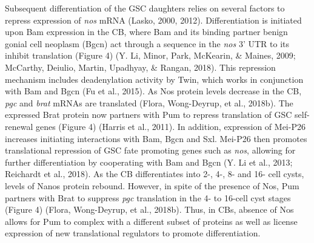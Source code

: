 \documentclass[12pt,oneside]{reedthesis}
\begin{document}
Subsequent differentiation of the GSC daughters relies on several
factors to repress expression of \emph{nos} mRNA (Lasko, 2000, 2012). Differentiation is initiated upon Bam expression in the
CB, where Bam and its binding partner benign gonial cell neoplasm (Bgcn)
act through a sequence in the \emph{nos} 3' UTR to its inhibit translation
(Figure 4) (Y. Li, Minor, Park, McKearin, \& Maines, 2009; McCarthy, Deiulio, Martin, Upadhyay, \& Rangan, 2018). This repression mechanism
includes deadenylation activity by Twin, which works in conjunction with
Bam and Bgcn (Fu et al., 2015). As Nos protein levels decrease in the CB,
\emph{pgc} and \emph{brat} mRNAs are translated (Flora, Wong-Deyrup, et al., 2018b). The expressed
Brat protein now partners with Pum to repress translation of GSC
self-renewal genes (Figure 4) (Harris et al., 2011). In addition, expression
of Mei-P26 increases initiating interactions with Bam, Bgcn and Sxl.
Mei-P26 then promotes translational repression of GSC fate promoting
genes such as \emph{nos}, allowing for further differentiation by cooperating
with Bam and Bgcn (Y. Li et al., 2013; Reichardt et al., 2018). As the CB
differentiates into 2-, 4-, 8- and 16- cell cysts, levels of Nanos
protein rebound. However, in spite of the presence of Nos, Pum partners
with Brat to suppress \emph{pgc} translation in the 4- to 16-cell cyst stages
(Figure 4) (Flora, Wong-Deyrup, et al., 2018b). Thus, in CBs, absence of Nos allows for Pum
to complex with a different subset of proteins as well as license
expression of new translational regulators to promote differentiation.
\end{document}
